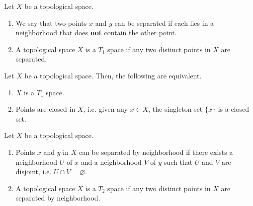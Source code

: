 \begin{defbox}
    \begin{definition}[\(T_1\) Space]
        Let \(X\) be a {\color{mathif}topological space}.
        \begin{enumerate}
            \item We say that two {\color{mathobj}points} \(x\) and \(y\) can be {\color{maththen}separated} if each lies in a {\color{mathif}neighborhood} that does \textbf{not} contain the other point.

            \item A {\color{mathobj}topological space} \(X\) is a {\color{maththen}\(T_1\) space} if any two distinct points in \(X\) are {\color{mathif}separated}.
        \end{enumerate}
    \end{definition}
\end{defbox}
%
\begin{thmbox}
    \begin{proposition}
        Let \(X\) be a {\color{mathif}topological space}. Then, the following are {\color{mathrem}equivalent}.
        \begin{enumerate}
            \item \(X\) is a {\color{maththen}\(T_1\) space}.
            \item {\color{mathif}Points} are {\color{maththen}closed} in \(X\), i.e. given any \(x \in X\), the {\color{mathif}singleton} set \(\{x\}\) is a {\color{maththen}closed} set.
        \end{enumerate}
    \end{proposition}
\end{thmbox}
%
\begin{defbox}
    \begin{definition}[\(T_2\) Space]
        Let \(X\) be a {\color{mathif}topological space}.
        \begin{enumerate}
            \item {\color{mathobj}Points} \(x\) and \(y\) in \(X\) can be {\color{maththen}separated by neighborhood} if there exists a {\color{mathif}neighborhood} \(U\) of \(x\) and a {\color{mathif}neighborhood} \(V\) of \(y\) such that \(U\) and \(V\) are {\color{mathif}disjoint}, i.e. \(U \cap V = \varnothing\).
            \item A {\color{mathobj}topological space} \(X\) is a {\color{maththen}\(T_2\) space} if any two distinct points in \(X\) are {\color{mathif}separated by neighborhood}.
        \end{enumerate}
    \end{definition}
\end{defbox}
